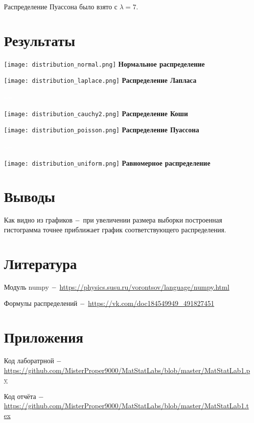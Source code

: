 \documentclass[a4]{article}
\begin{document}
Распределение Пуассона было взято с $\lambda = 7.$
\newpage
\section{Результаты}
\begin{center}

\vspace{-11cm}
\texttt{[image: distribution\_normal.png]} \textbf{Нормальное распределение}

\vspace{-9cm}
\texttt{[image: distribution\_laplace.png]} \textbf{Распределение Лапласа}

\newpage
\par \textcolor{white}{sas}%

\vspace{-11cm}
\texttt{[image: distribution\_cauchy2.png]} \textbf{Распределение Коши}

\vspace{-9cm}
\texttt{[image: distribution\_poisson.png]} \textbf{Распределение Пуассона}

\newpage
\par \textcolor{white}{sas}

\vspace{-11cm}
\texttt{[image: distribution\_uniform.png]} \textbf{Равномерное распределение}

\end{center}


\section{Выводы}
\par Как видно из графиков $\--$ при увеличении размера выборки построенная гистограмма точнее приближает график соответствующего распределения.



\section{Литература}

Модуль numpy $\--$ \href{a}{https://physics.susu.ru/vorontsov/language/numpy.html}

Формулы распределений $\--$ \href{d}{https://vk.com/doc184549949\_491827451}

\section{Приложения}

Код лаборатрной $\--$ \href{a}{https://github.com/MisterProper9000/MatStatLabs/blob/master/MatStatLab1.py}

Код отчёта $\--$ \href{a}{https://github.com/MisterProper9000/MatStatLabs/blob/master/MatStatLab1.tex}
\end{document}
